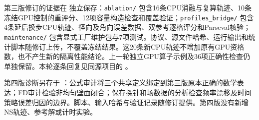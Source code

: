 第三版修订的证据在  独立保存：\texttt{ablation/} 包含16条CPU消融与复算轨迹、10条冻结GPU控制的重评分、12项容量构造检查和覆盖验证；\texttt{profiles\_bridge/} 包含4条延后换步CPU轨迹、径向及角向误差数据、双参考逐格评分和Parseval核验；\texttt{maintenance/} 包含显式工厂维护包与7项测试。协议、源文件哈希、运行输出和统计脚本随修订上传，不覆盖冻结结果。这20条新CPU轨迹不增加原有GPU资格数，也不产生新的隔离性能结论。上一轮独立GPU算子示例及36项正确性检查仍单独保留。本轮逐条回复见同源项目的 。

第四版诊断另存于 ：公式审计将三个共享定义绑定到第三版原本正确的数学表达；FD审计检验非均匀壁面闭合；保存探针和场数据的分析检查频率漂移及时间策略误差归因的边界。脚本、输入哈希与验证记录随修订提供。第四版没有新增NS轨迹、参考解或计时实验。
